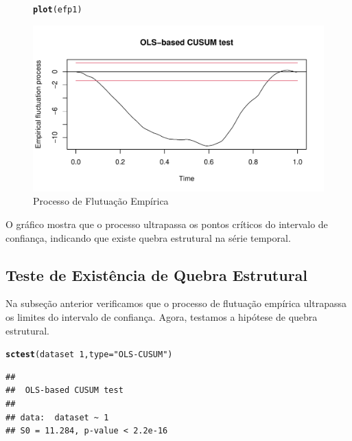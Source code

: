 \documentclass{article}\usepackage[]{graphicx}\usepackage[]{color}
\makeatletter
\def\maxwidth{ %
  \ifdim\Gin@nat@width>\linewidth
    \linewidth
  \else
    \Gin@nat@width
  \fi
}
\newcommand{\hlnum}[1]{\textcolor[rgb]{0.686,0.059,0.569}{#1}}%
\newcommand{\hlstr}[1]{\textcolor[rgb]{0.192,0.494,0.8}{#1}}%
\newcommand{\hlopt}[1]{\textcolor[rgb]{0,0,0}{#1}}%
\newcommand{\hlstd}[1]{\textcolor[rgb]{0.345,0.345,0.345}{#1}}%
\newcommand{\hlkwc}[1]{\textcolor[rgb]{0.333,0.667,0.333}{#1}}%
\newcommand{\hlkwd}[1]{\textcolor[rgb]{0.737,0.353,0.396}{\textbf{#1}}}%
\newenvironment{kframe}{%
 \def\at@end@of@kframe{}%
 \ifinner\ifhmode%
  \def\at@end@of@kframe{\end{minipage}}%
  \begin{minipage}{\columnwidth}%
 \fi\fi%
 \def\FrameCommand##1{\hskip\@totalleftmargin \hskip-\fboxsep
 \colorbox{shadecolor}{##1}\hskip-\fboxsep
     \hskip-\linewidth \hskip-\@totalleftmargin \hskip\columnwidth}%
 \MakeFramed {\advance\hsize-\width
   \@totalleftmargin\z@ \linewidth\hsize
   \@setminipage}}%
 {\par\unskip\endMakeFramed%
 \at@end@of@kframe}
\newenvironment{knitrout}{}{} %
\makeatother
\begin{document}
        \begin{figure}[H]
        \caption{Processo de Flutuação Empírica}
        \centering
\begin{knitrout}
\color{fgcolor}\begin{kframe}
\begin{alltt}
\hlkwd{plot}\hlstd{(efp1)}
\end{alltt}
\end{kframe}
\includegraphics[width=\maxwidth]{figure/unnamed-chunk-23-1} 

\end{knitrout}
        \end{figure}
        
        O gráfico mostra que o processo ultrapassa os pontos críticos do intervalo de confiança, indicando que existe quebra estrutural na série temporal.

    \subsection{Teste de Existência de Quebra Estrutural}
    
        Na subseção anterior verificamos que o processo de flutuação empírica ultrapassa os limites do intervalo de confiança. Agora, testamos a hipótese de quebra estrutural.
    
\begin{knitrout}
\color{fgcolor}\begin{kframe}
\begin{alltt}
\hlkwd{sctest}\hlstd{(dataset}\hlopt{~}\hlnum{1}\hlstd{,} \hlkwc{type}\hlstd{=}\hlstr{"OLS-CUSUM"}\hlstd{)}
\end{alltt}
\begin{verbatim}
## 
## 	OLS-based CUSUM test
## 
## data:  dataset ~ 1
## S0 = 11.284, p-value < 2.2e-16
\end{verbatim}
\end{kframe}
\end{knitrout}
\end{document}
